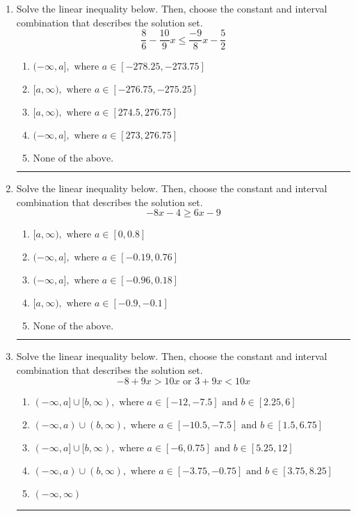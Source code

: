 \documentclass[14pt]{extbook}
\newcommand{\litem}[1]{\item#1\hspace*{-1cm}\rule{\textwidth}{0.4pt}}
\begin{document}
\begin{enumerate}
{\begin{enumerate}[label=\Alph*.]
\end{enumerate} }
\litem{
Solve the linear inequality below. Then, choose the constant and interval combination that describes the solution set.\[ \frac{8}{6} - \frac{10}{9} x \leq \frac{-9}{8} x - \frac{5}{2} \]\begin{enumerate}[label=\Alph*.]
\item \( (-\infty, a], \text{ where } a \in [-278.25, -273.75] \)
\item \( [a, \infty), \text{ where } a \in [-276.75, -275.25] \)
\item \( [a, \infty), \text{ where } a \in [274.5, 276.75] \)
\item \( (-\infty, a], \text{ where } a \in [273, 276.75] \)
\item \( \text{None of the above}. \)

\end{enumerate} }
\litem{
Solve the linear inequality below. Then, choose the constant and interval combination that describes the solution set.\[ -8x -4 \geq 6x -9 \]\begin{enumerate}[label=\Alph*.]
\item \( [a, \infty), \text{ where } a \in [0, 0.8] \)
\item \( (-\infty, a], \text{ where } a \in [-0.19, 0.76] \)
\item \( (-\infty, a], \text{ where } a \in [-0.96, 0.18] \)
\item \( [a, \infty), \text{ where } a \in [-0.9, -0.1] \)
\item \( \text{None of the above}. \)

\end{enumerate} }
\litem{
Solve the linear inequality below. Then, choose the constant and interval combination that describes the solution set.\[ -8 + 9 x > 10 x \text{ or } 3 + 9 x < 10 x \]\begin{enumerate}[label=\Alph*.]
\item \( (-\infty, a] \cup [b, \infty), \text{ where } a \in [-12, -7.5] \text{ and } b \in [2.25, 6] \)
\item \( (-\infty, a) \cup (b, \infty), \text{ where } a \in [-10.5, -7.5] \text{ and } b \in [1.5, 6.75] \)
\item \( (-\infty, a] \cup [b, \infty), \text{ where } a \in [-6, 0.75] \text{ and } b \in [5.25, 12] \)
\item \( (-\infty, a) \cup (b, \infty), \text{ where } a \in [-3.75, -0.75] \text{ and } b \in [3.75, 8.25] \)
\item \( (-\infty, \infty) \)


\end{enumerate}}
\end{enumerate}
\end{document}
